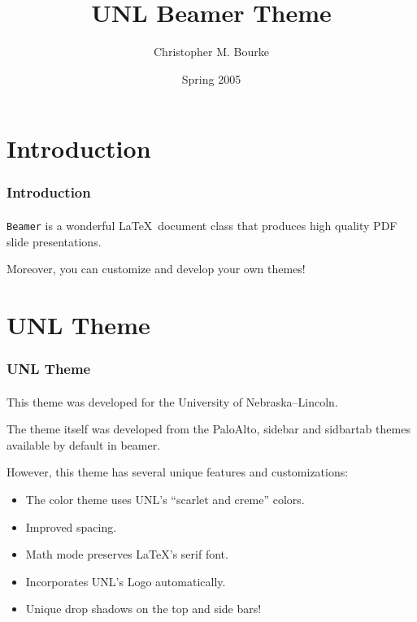 \documentclass{beamer}
\title{UNL Beamer Theme}
\author{Christopher M. Bourke} %
\institute{University Of Nebraska -- Lincoln}
\date{Spring 2005}
\begin{document}
\begin{frame}
        \titlepage
        \begin{center}
    \href{mailto:cbourke@cse.unl.edu}{}
        \end{center}
\end{frame}


\section{Introduction}

\begin{frame}
    \frametitle{Introduction}
    \framesubtitle{}

    \texttt{Beamer} is a wonderful \LaTeX\ document class that produces
    high quality PDF slide presentations.
    
    Moreover, you can customize and develop your own themes!

\end{frame}

\section{UNL Theme}    

\begin{frame}
    \frametitle{UNL Theme}
    \framesubtitle{}

    This theme was developed for the University of Nebraska--Lincoln.
    
    The theme itself was developed from the PaloAlto, sidebar and sidbartab
    themes available by default in beamer.
    
    However, this theme has several unique features and customizations:
    \begin{itemize}
      \item The color theme uses UNL's ``scarlet and creme'' colors.
      \item Improved spacing.
      \item Math mode preserves \LaTeX's serif font.
      \item Incorporates UNL's Logo automatically.
      \item Unique drop shadows on the top and side bars!
    \end{itemize}

\end{frame}
\end{document}
